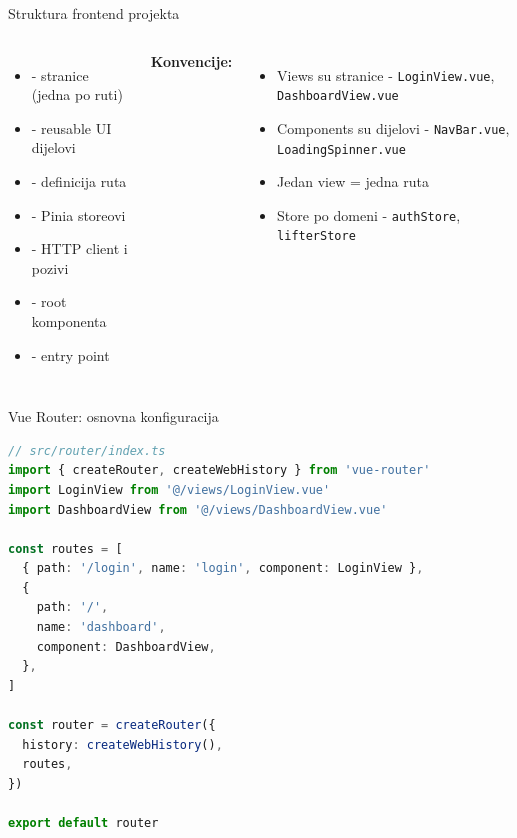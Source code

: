 \begin{frame}{Struktura frontend projekta}
\begin{columns}[T]
\begin{itemize}
  \item {} - stranice (jedna po ruti)
  \item {} - reusable UI dijelovi
  \item {} - definicija ruta
  \item {} - Pinia storeovi
  \item {} - HTTP client i pozivi
  \item {} - root komponenta
  \item {} - entry point
\end{itemize}

\textbf{Konvencije:}
\begin{itemize}
  \item Views su stranice - \texttt{LoginView.vue}, \texttt{DashboardView.vue}
  \item Components su dijelovi - \texttt{NavBar.vue}, \texttt{LoadingSpinner.vue}
  \item Jedan view = jedna ruta
  \item Store po domeni - \texttt{authStore}, \texttt{lifterStore}
\end{itemize}
\end{columns}
\end{frame}

\begin{frame}[fragile,shrink=5]{Vue Router: osnovna konfiguracija}
\begin{lstlisting}[language=typescript]
// src/router/index.ts
import { createRouter, createWebHistory } from 'vue-router'
import LoginView from '@/views/LoginView.vue'
import DashboardView from '@/views/DashboardView.vue'

const routes = [
  { path: '/login', name: 'login', component: LoginView },
  {
    path: '/',
    name: 'dashboard',
    component: DashboardView,
  },
]

const router = createRouter({
  history: createWebHistory(),
  routes,
})

export default router
\end{lstlisting}
\end{frame}

